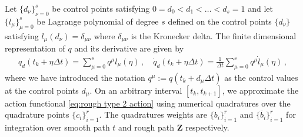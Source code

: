 \documentclass[11pt, oneside]{article}
\numberwithin{equation}{section}
\theoremstyle{definition}
\newcommand{\ob}[1]{\overline{#1}}
\begin{document}
Let $\{d_\nu\}_{\nu=0}^s$ be control points satisfying $0 = d_0 < d_1 <\ldots < d_s = 1$ and let $\{l_{\mu}\}_{\mu=0}^s$ be Lagrange polynomial of degree $s$ defined on the control points $\{d_\nu\}$ satisfying $l_\mu(d_{\nu}) = \delta_{\mu\nu}$ where $\delta_{\mu\nu}$ is the Kronecker delta. The finite dimensional representation of $q$ and its derivative are given by
\begin{align}
    q_d(t_k + \eta \Delta t) = \sum_{\mu=0}^s q^\mu l_\mu(\eta)\,,\quad \dot{q}_d(t_k + \eta \Delta t) = \frac{1}{\Delta t}\sum_{\mu=0}^s q^\mu \dot{l}_\mu(\eta)\,, \label{eq:rough q interpolation}
\end{align}
where we have introduced the notation $q^\mu := q(t_k + d_\mu\Delta t)$ as the control values at the control points $d_\mu$. On an arbitrary interval $[t_k, t_{k+1}]$, we approximate the action functional \eqref{eq:rough type 2 action} using numerical quadratures over the quadrature points $\{c_i\}_{i=1}^r$. The quadratures weights are $\{b_i\}_{i=1}^r$ and $\{\ob{b}_i\}_{i=1}^r$ for integration over smooth path $t$ and rough path $\mathbf{Z}$ respectively.
\end{document}
